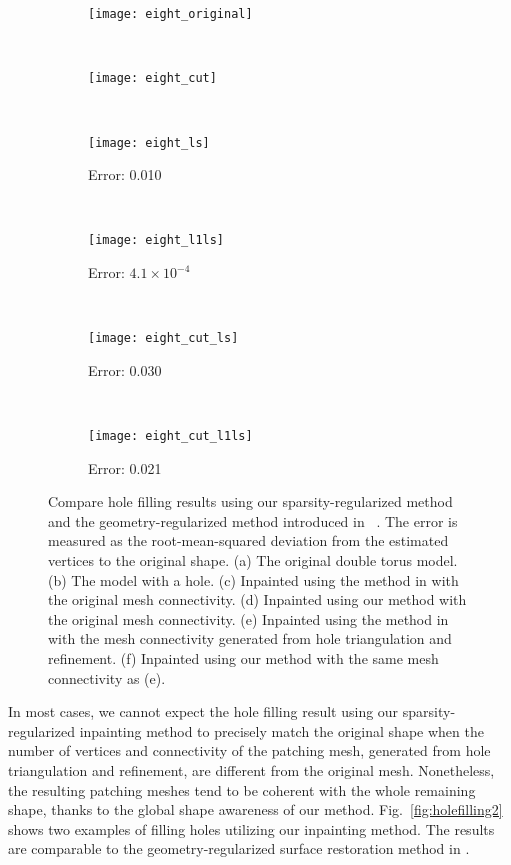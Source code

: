 \begin{figure}
\centering
    \begin{subfigure}[b]{0.3\linewidth}
    \texttt{[image: eight\_original]}
    \caption{}
    \end{subfigure}
    ~
    \begin{subfigure}[b]{0.3\linewidth}
    \texttt{[image: eight\_cut]}
    \caption{}
    \end{subfigure}
    ~
    \begin{subfigure}[b]{0.3\linewidth}
    \texttt{[image: eight\_ls]}
    \caption{Error: 0.010}
    \end{subfigure}
    \\
    \begin{subfigure}[b]{0.3\linewidth}
    \texttt{[image: eight\_l1ls]}
    \caption{Error: $4.1\times 10^{-4}$}
    \end{subfigure}
    ~
    \begin{subfigure}[b]{0.3\linewidth}
    \texttt{[image: eight\_cut\_ls]}
    \caption{Error: 0.030}
    \end{subfigure}
    ~
    \begin{subfigure}[b]{0.3\linewidth}
    \texttt{[image: eight\_cut\_l1ls]}
    \caption{Error: 0.021}
    \end{subfigure}
\caption{Compare hole filling results using our sparsity-regularized method and the geometry-regularized method introduced in ~\cite{Bac2008}.
        The error is measured as the root-mean-squared deviation from the estimated vertices to the original shape.
        (a) The original double torus model.
        (b) The model with a hole.
        (c) Inpainted using the method in \cite{Bac2008} with the original mesh connectivity.
        (d) Inpainted using our method with the original mesh connectivity.
        (e) Inpainted using the method in \cite{Bac2008} with the mesh connectivity generated from hole triangulation and refinement.
        (f) Inpainted using our method with the same mesh connectivity as (e).}

\label{fig:holefilling1}
\end{figure}

In most cases, we cannot expect the hole filling result using our sparsity-regularized inpainting method to
precisely match the original shape when the number of vertices and connectivity of the patching mesh, generated
from hole triangulation and refinement, are different from the original mesh.
Nonetheless, the resulting patching meshes tend to be coherent with
the whole remaining shape, thanks to the global shape awareness of our method.
Fig.~\ref{fig:holefilling2} shows two examples of filling holes utilizing our inpainting method. The results
are comparable to the geometry-regularized surface restoration method in \cite{Bac2008}.

